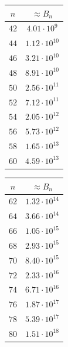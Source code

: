 \documentclass[runningheads,orivec]{llncs}
\begin{document}
\begin{table}
\begin{minipage}{0.24\textwidth}
\begin{tabular}{|c|c|}
            \end{tabular}
        \end{minipage}%
        \begin{minipage}{0.24\textwidth}
            \centering
            \begin{tabular}{|c|c|}
                \hline
                $n$&$\approx B_n$\\
                \hline
                $42$&$4.01\cdot 10^{9}$\\
                $44$&$1.12\cdot 10^{10}$\\
                $46$&$3.21\cdot 10^{10}$\\
                $48$&$8.91\cdot 10^{10}$\\
                $50$&$2.56\cdot 10^{11}$\\
                $52$&$7.12\cdot 10^{11}$\\
                $54$&$2.05\cdot 10^{12}$\\
                $56$&$5.73\cdot 10^{12}$\\
                $58$&$1.65\cdot 10^{13}$\\
                $60$&$4.59\cdot 10^{13}$\\
                \hline
            \end{tabular}
        \end{minipage}%
        \begin{minipage}{0.24\textwidth}
            \centering
            \begin{tabular}{|c|c|}
                \hline
                $n$&$\approx B_n$\\
                \hline
                $62$&$1.32\cdot 10^{14}$\\
                $64$&$3.66\cdot 10^{14}$\\
                $66$&$1.05\cdot 10^{15}$\\
                $68$&$2.93\cdot 10^{15}$\\
                $70$&$8.40\cdot 10^{15}$\\
                $72$&$2.33\cdot 10^{16}$\\
                $74$&$6.71\cdot 10^{16}$\\
                $76$&$1.87\cdot 10^{17}$\\
                $78$&$5.39\cdot 10^{17}$\\
                $80$&$1.51\cdot 10^{18}$\\
                \hline
            \end{tabular}
        \end{minipage}
    \end{table}
    
\end{document}

